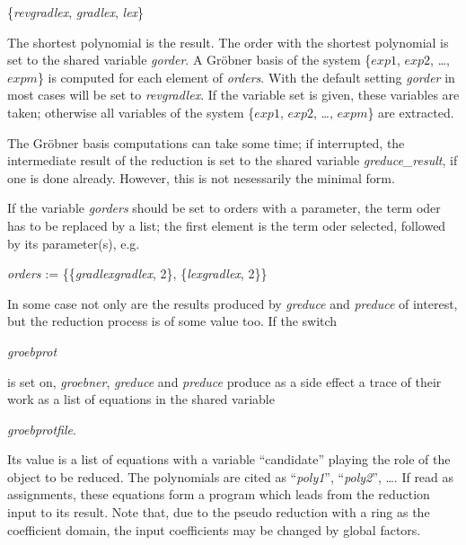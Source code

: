 \begin{center}
\{\emph{revgradlex}, \emph{gradlex}, \emph{lex}\}
\end{center}

The shortest polynomial is the result.
The order with the shortest polynomial is set to the shared variable
{\it gorder}. A Gr\"obner basis of the system \{$exp1$, $exp2$, \ldots ,
$expm$\} is computed for each element of \emph{orders}.
With the default setting {\it gorder} in most cases will be set
to {\it revgradlex}.
If the variable set is given, these variables are taken; otherwise all
variables of the system \{$exp1$, $exp2$, \ldots , $expm$\} are
extracted.

The Gr\"obner basis computations can take some time; if interrupted, the
intermediate result of the reduction is set to the shared variable
\emph{greduce\_result}, if one is done already. However, this is not
nesessarily the minimal form.

If the variable {\it gorders} should be set to orders with a parameter,
the term oder has to be replaced by a list; the first element is the
term oder selected, followed by its parameter(s), e.g.

\begin{center}
\emph{orders} := \{\{\emph{gradlexgradlex}, 2\}, \{\emph{lexgradlex}, 2\}\}
\end{center}

In some case not only are the results produced by \emph{greduce} and
\emph{preduce} of interest, but the reduction process is of some value
too. If the switch
\hypertarget{switch:GROEBPROT}{}
\begin{center}
\emph{groebprot}
\end{center}
is set on, \emph{groebner}, \emph{greduce} and \emph{preduce} produce as a side effect
a trace of their work as a \REDUCE list of equations in the shared variable
\hypertarget{reserved:GROEBPROTFILE}{}
\begin{center}
\emph{groebprotfile}.
\end{center}
Its value is a list of equations with a variable ``candidate'' playing
the role of the object to be reduced. The polynomials are cited as
``\emph{poly1}'', ``\emph{poly2}'', \ldots\;. If read as assignments, these equations
form a program which leads from the reduction input to its result.
Note that, due to the pseudo reduction with a ring as the coefficient
domain, the input coefficients may be changed by global factors.

